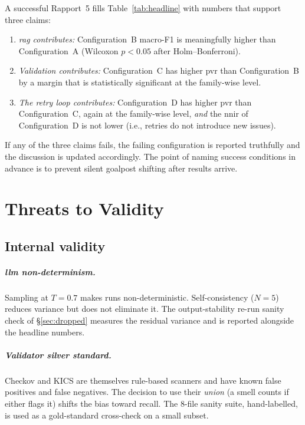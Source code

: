 \documentclass[12pt, a4paper]{report}
\begin{document}
A successful Rapport~5 fills Table~\ref{tab:headline} with numbers that
support three claims:

\begin{enumerate}
  \item \emph{\gls{rag} contributes:} Configuration~B macro-F1 is
        meaningfully higher than Configuration~A (Wilcoxon
        $p < 0.05$ after Holm--Bonferroni).
  \item \emph{Validation contributes:} Configuration~C has higher
        \gls{pvr} than Configuration~B by a margin that is
        statistically significant at the family-wise level.
  \item \emph{The retry loop contributes:} Configuration~D has higher
        \gls{pvr} than Configuration~C, again at the family-wise level,
        \emph{and} the \gls{nnir} of Configuration~D is not lower
        (i.e., retries do not introduce new issues).
\end{enumerate}

If any of the three claims fails, the failing configuration is reported
truthfully and the discussion is updated accordingly. The point of
naming success conditions in advance is to prevent silent goalpost
shifting after results arrive.

\chapter{Threats to Validity}
\label{chap:threats}

\section{Internal validity}

\paragraph{\gls{llm} non-determinism.}
Sampling at $T=0.7$ makes runs non-deterministic. Self-consistency
($N=5$) reduces variance but does not eliminate it. The
output-stability re-run sanity check of \S\ref{sec:dropped} measures
the residual variance and is reported alongside the headline numbers.

\paragraph{Validator silver standard.}
Checkov and KICS are themselves rule-based scanners and have known
false positives and false negatives. The decision to use their
\emph{union} (a smell counts if either flags it) shifts the bias toward
recall. The 8-file sanity suite, hand-labelled, is used as a
gold-standard cross-check on a small subset.
\end{document}
